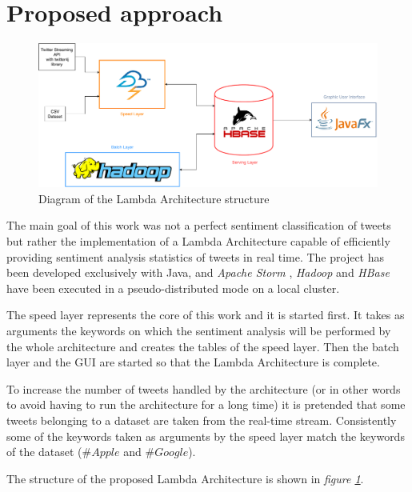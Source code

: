 \documentclass[10pt,twocolumn,letterpaper]{article}
\begin{document}
\section{Proposed approach}

\begin{figure}[t!]
\centering
\includegraphics[width=0.99\linewidth]{img/lambda_architecture_diagram}
\vspace{0.5cm}
\caption{Diagram of the Lambda Architecture structure}
\label{fig:lambda_architecture_diagram}
\end{figure}

The main goal of this work was not a perfect sentiment classification of tweets but rather the implementation of a Lambda Architecture capable of efficiently providing sentiment analysis statistics of tweets in real time. The project has been developed exclusively with Java, and \emph{Apache Storm} \cite{Storm}, \emph{Hadoop} \cite{Hadoop} and \emph{HBase} \cite{HBase} have been executed in a pseudo-distributed mode on a local cluster.

The speed layer represents the core of this work and it is started first. It takes as arguments the keywords on which the sentiment analysis will be performed by the whole architecture and creates the tables of the speed layer. Then the batch layer and the GUI are started so that the Lambda Architecture is complete.

To increase the number of tweets handled by the architecture (or in other words to avoid having to run the architecture for a long time) it is pretended that some tweets belonging to a dataset \cite{guyzGithubDataset} are taken from the real-time stream. Consistently some of the keywords taken as arguments by the speed layer match the keywords of the dataset (\eg $\#Apple$ and $\#Google$).

The structure of the proposed Lambda Architecture is shown in \emph{figure \ref{fig:lambda_architecture_diagram}}.
\end{document}
